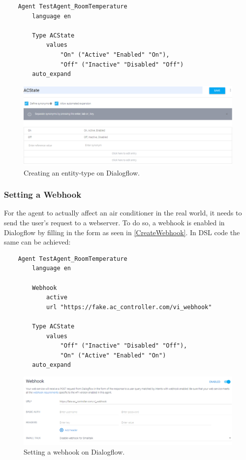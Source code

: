 \begin{verbatim}
    Agent TestAgent_RoomTemperature
        language en 
    
        Type ACState
            values 
                "On" ("Active" "Enabled" "On"),
                "Off" ("Inactive" "Disabled" "Off")
        auto_expand
\end{verbatim}

\begin{figure}[ht]
    \centering
    \includegraphics[width=1\textwidth]{Thesis Images/CreateType.PNG}
    \caption{Creating an entity-type on Dialogflow.}
        \label{CreateType}
\end{figure}

\subsubsection{Setting a Webhook}
For the agent to actually affect an air conditioner in the real world, it needs to send the user's request to a webserver. To do so, a webhook is enabled in Dialogflow by filling in the form as seen in \autoref{CreateWebhook}.
In DSL code the same can be achieved:
\begin{verbatim}
    Agent TestAgent_RoomTemperature
        language en 
            
        Webhook 
            active 
            url "https://fake.ac_controller.com/vi_webhook"

        Type ACState
            values 
                "Off" ("Inactive" "Disabled" "Off"),
                "On" ("Active" "Enabled" "On")
        auto_expand
\end{verbatim}

\begin{figure}[ht]
    \centering
    \includegraphics[width=1\textwidth]{Thesis Images/CreateWebhook.PNG}
    \caption{Setting a webhook on Dialogflow.}
        \label{CreateWebhook}
\end{figure}

